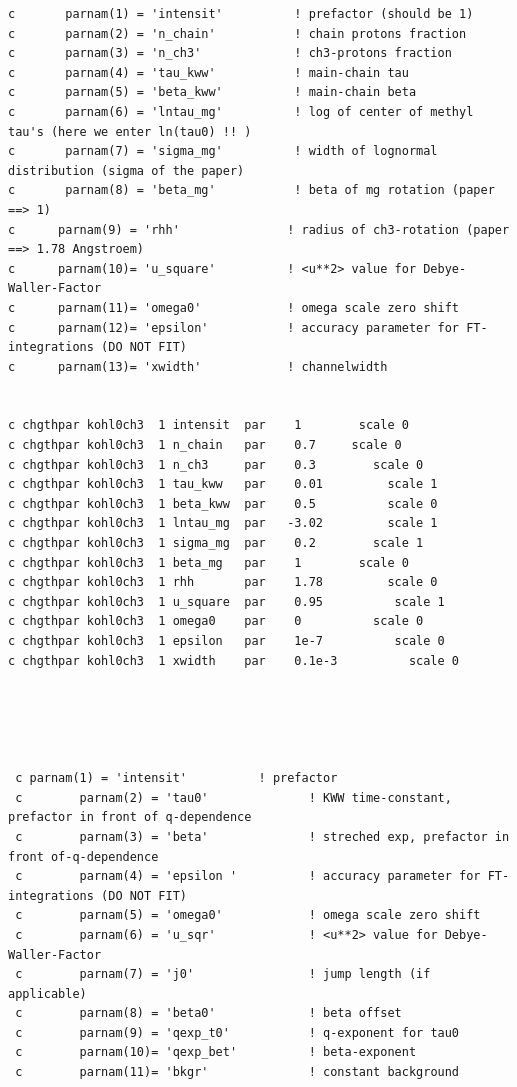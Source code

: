 \documentclass[11pt,fleqn]{book} %
\begin{document}
\begin{verbatim}
c       parnam(1) = 'intensit'          ! prefactor (should be 1)
c		parnam(2) = 'n_chain'           ! chain protons fraction
c       parnam(3) = 'n_ch3'             ! ch3-protons fraction
c       parnam(4) = 'tau_kww'           ! main-chain tau
c       parnam(5) = 'beta_kww'          ! main-chain beta
c       parnam(6) = 'lntau_mg'          ! log of center of methyl tau's (here we enter ln(tau0) !! )
c       parnam(7) = 'sigma_mg'          ! width of lognormal distribution (sigma of the paper)
c       parnam(8) = 'beta_mg'           ! beta of mg rotation (paper ==> 1)
c      parnam(9) = 'rhh'               ! radius of ch3-rotation (paper ==> 1.78 Angstroem)
c      parnam(10)= 'u_square'          ! <u**2> value for Debye-Waller-Factor
c      parnam(11)= 'omega0'            ! omega scale zero shift
c      parnam(12)= 'epsilon'           ! accuracy parameter for FT-integrations (DO NOT FIT)
c      parnam(13)= 'xwidth'            ! channelwidth


c chgthpar kohl0ch3  1 intensit  par    1        scale 0      
c chgthpar kohl0ch3  1 n_chain   par    0.7     scale 0
c chgthpar kohl0ch3  1 n_ch3     par    0.3        scale 0
c chgthpar kohl0ch3  1 tau_kww   par    0.01         scale 1
c chgthpar kohl0ch3  1 beta_kww  par    0.5 	     scale 0
c chgthpar kohl0ch3  1 lntau_mg  par   -3.02	     scale 1
c chgthpar kohl0ch3  1 sigma_mg  par    0.2        scale 1
c chgthpar kohl0ch3  1 beta_mg   par    1 	     scale 0
c chgthpar kohl0ch3  1 rhh       par    1.78 	     scale 0
c chgthpar kohl0ch3  1 u_square  par    0.95          scale 1
c chgthpar kohl0ch3  1 omega0    par    0          scale 0
c chgthpar kohl0ch3  1 epsilon   par    1e-7          scale 0
c chgthpar kohl0ch3  1 xwidth    par    0.1e-3          scale 0





 c parnam(1) = 'intensit'          ! prefactor
 c        parnam(2) = 'tau0'              ! KWW time-constant, prefactor in front of q-dependence
 c        parnam(3) = 'beta'              ! streched exp, prefactor in front of-q-dependence
 c        parnam(4) = 'epsilon '          ! accuracy parameter for FT-integrations (DO NOT FIT)
 c        parnam(5) = 'omega0'            ! omega scale zero shift
 c        parnam(6) = 'u_sqr'             ! <u**2> value for Debye-Waller-Factor
 c        parnam(7) = 'j0'                ! jump length (if applicable)
 c        parnam(8) = 'beta0'             ! beta offset
 c        parnam(9) = 'qexp_t0'           ! q-exponent for tau0
 c        parnam(10)= 'qexp_bet'          ! beta-exponent 
 c        parnam(11)= 'bkgr'              ! constant background 



\end{verbatim}
\end{document}
